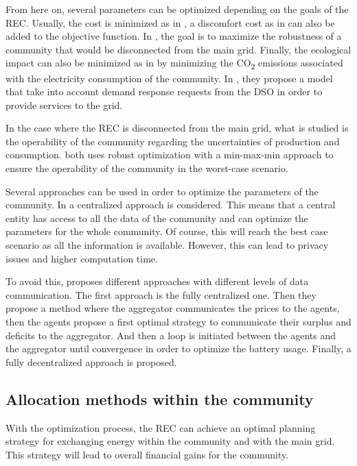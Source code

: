 From here on, several parameters can be optimized depending on the goals of the REC. Usually, the cost is minimized as in \cite{article_1, article_7, these_celik}, a discomfort cost as in \cite{article_6} can also be added to the objective function. In \cite{article_5}, the goal is to maximize the robustness of a community that would be disconnected from the main grid. Finally, the ecological impact can also be minimized as in \cite{these_sorel} by minimizing the CO\textsubscript{2} emissions associated with the electricity consumption of the community. In \cite{article_7}, they propose a model that take into account demand response requests from the DSO in order to provide services to the grid.

In the case where the REC is disconnected from the main grid, what is studied is the operability of the community regarding the uncertainties of production and consumption. \cite{article_3, article_5} both uses robust optimization with a min-max-min approach to ensure the operability of the community in the worst-case scenario.

Several approaches can be used in order to optimize the parameters of the community. In \cite{article_6, article_1} a centralized approach is considered. This means that a central entity has access to all the data of the community and can optimize the parameters for the whole community. Of course, this will reach the best case scenario as all the information is available. However, this can lead to privacy issues and higher computation time. 

To avoid this, \cite{these_celik} proposes different approaches with different levels of data communication. The first approach is the fully centralized one. Then they propose a method where the aggregator communicates the prices to the agents, then the agents propose a first optimal strategy to communicate their surplus and deficits to the aggregator. And then  a loop is initiated between the agents and the aggregator until convergence in order to optimize the battery usage. Finally, a fully decentralized approach is proposed.


\subsection{Allocation methods within the community}
\label{section_allocation}

With the optimization process, the REC can achieve an optimal planning strategy for exchanging energy within the community and with the main grid. This strategy will lead to overall financial gains for the community. 

